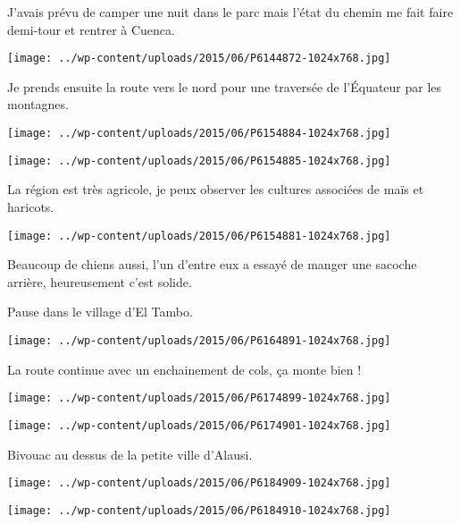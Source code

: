 J'avais prévu de camper une nuit dans le parc mais l'état du chemin me fait faire demi-tour et rentrer à Cuenca. 
\begin{center} \texttt{[image: ../wp-content/uploads/2015/06/P6144872-1024x768.jpg]} \end{center}

Je prends ensuite la route vers le nord pour une traversée de l'Équateur par les montagnes. 
\begin{center} \texttt{[image: ../wp-content/uploads/2015/06/P6154884-1024x768.jpg]} \end{center}
\begin{center} \texttt{[image: ../wp-content/uploads/2015/06/P6154885-1024x768.jpg]} \end{center}

La région est très agricole, je peux observer les cultures associées de maïs et haricots. 
\begin{center} \texttt{[image: ../wp-content/uploads/2015/06/P6154881-1024x768.jpg]} \end{center}
\pagebreak

Beaucoup de chiens aussi, l'un d'entre eux a essayé de manger une sacoche arrière, heureusement c'est solide.

Pause dans le village d'El Tambo. 
\begin{center} \texttt{[image: ../wp-content/uploads/2015/06/P6164891-1024x768.jpg]} \end{center}

La route continue avec un enchainement de cols, ça monte bien ! 
\begin{center} \texttt{[image: ../wp-content/uploads/2015/06/P6174899-1024x768.jpg]} \end{center}
\begin{center} \texttt{[image: ../wp-content/uploads/2015/06/P6174901-1024x768.jpg]} \end{center}

Bivouac au dessus de la petite ville d'Alausi. 
\begin{center} \texttt{[image: ../wp-content/uploads/2015/06/P6184909-1024x768.jpg]} \end{center}
\begin{center} \texttt{[image: ../wp-content/uploads/2015/06/P6184910-1024x768.jpg]} \end{center}

